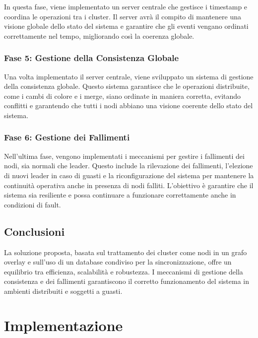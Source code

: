 \documentclass[12pt, a4paper]{report}
\begin{document}
In questa fase, viene implementato un server centrale che gestisce i timestamp e coordina le operazioni tra i cluster. Il server avr\`a il compito di mantenere una visione globale dello stato del sistema e garantire che gli eventi vengano ordinati correttamente nel tempo, migliorando così la coerenza globale.

\subsection*{Fase 5: Gestione della Consistenza Globale}

Una volta implementato il server centrale, viene sviluppato un sistema di gestione della consistenza globale. Questo sistema garantisce che le operazioni distribuite, come i cambi di colore e i merge, siano ordinate in maniera corretta, evitando conflitti e garantendo che tutti i nodi abbiano una visione coerente dello stato del sistema.

\subsection*{Fase 6: Gestione dei Fallimenti}

Nell'ultima fase, vengono implementati i meccanismi per gestire i fallimenti dei nodi, sia normali che leader. Questo include la rilevazione dei fallimenti, l'elezione di nuovi leader in caso di guasti e la riconfigurazione del sistema per mantenere la continuit\`a operativa anche in presenza di nodi falliti. L'obiettivo \`e garantire che il sistema sia resiliente e possa continuare a funzionare correttamente anche in condizioni di fault.

\section{Conclusioni}

La soluzione proposta, basata sul trattamento dei cluster come nodi in un grafo overlay e sull'uso di un database condiviso per la sincronizzazione, offre un equilibrio tra efficienza, scalabilit\`a e robustezza. I meccanismi di gestione della consistenza e dei fallimenti garantiscono il corretto funzionamento del sistema in ambienti distribuiti e soggetti a guasti.


\newpage

\chapter{Implementazione}
\end{document}
